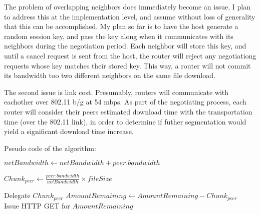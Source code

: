 \documentclass{article}
\begin{document}
The problem of overlapping neighbors does immediately become an issue. I plan to address this at the implementation level, and assume without loss of generality that this can be accomplished. My plan so far is to have the host generate a random session key, and pass the key along when it communicates with its neighbors during the negotiation period. Each neighbor will store this key, and until a cancel request is sent from the host, the router will reject any negotiationg requests whose key matches their stored key. This way, a router will not commit its bandwidth too two different neighbors on the same file download.

The second issue is link cost. Presumably, routers will communicate with eachother over 802.11 b/g at 54 mbps. As part of the negotiating process, each router will consider their peers estimated download time with the transportation time (over the 802.11 link), in order to determine if futher segmentation would yield a significant download time increase.

Pseudo code of the algorithm:

\begin{algorithmic}
	\State $netBandwidth\gets netBandwidth + peer.bandwidth$
\EndFor

	\State $Chunk_{peer} \gets \frac{peer.bandwidth}{netBandwidth} \times{fileSize}$
\EndFor

	Delegate $Chunk_{peer}$
	\State $AmountRemaining \gets AmountRemaining - Chunk_{peer}$
\EndFor\\
Issue HTTP GET for $AmountRemaining$

\end{algorithmic}
\end{document}
